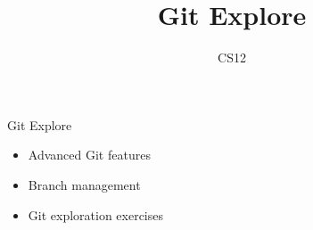 \documentclass{beamer}
\title{Git Explore}
\author{CS12}
\date{}
\begin{document}
\begin{frame}
    \titlepage
\end{frame}

\begin{frame}{Git Explore}
    \begin{itemize}
        \item Advanced Git features
        \item Branch management
        \item Git exploration exercises
    \end{itemize}
\end{frame}
\end{document}
